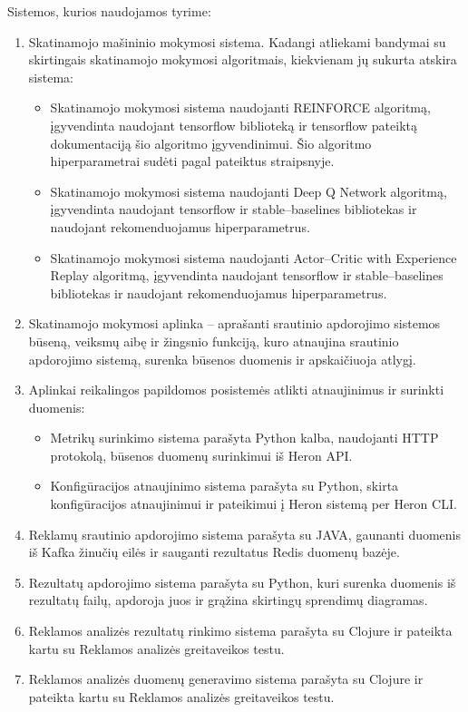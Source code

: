 \documentclass{VUMIFPSbakalaurinis}
\begin{document}
Sistemos, kurios naudojamos tyrime:
\begin{enumerate}
    \item Skatinamojo mašininio mokymosi sistema. Kadangi atliekami bandymai su skirtingais skatinamojo mokymosi algoritmais, kiekvienam jų sukurta atskira sistema: 
    \begin{itemize}
        \item Skatinamojo mokymosi sistema naudojanti REINFORCE algoritmą, įgyvendinta naudojant tensorflow biblioteką ir tensorflow pateiktą dokumentaciją šio algoritmo įgyvendinimui. Šio algoritmo hiperparametrai sudėti pagal pateiktus \cite{vaquero2018autotuning} straipsnyje.
        \item Skatinamojo mokymosi sistema naudojanti Deep Q Network algoritmą, įgyvendinta naudojant tensorflow ir stable–baselines bibliotekas ir naudojant rekomenduojamus hiperparametrus.
        \item Skatinamojo mokymosi sistema naudojanti Actor–Critic with Experience Replay algoritmą, įgyvendinta naudojant tensorflow ir stable–baselines bibliotekas ir naudojant rekomenduojamus hiperparametrus.
    \end{itemize}
    \item Skatinamojo mokymosi aplinka – aprašanti srautinio apdorojimo sistemos būseną, veiksmų aibę ir žingsnio funkciją, kuro atnaujina srautinio apdorojimo sistemą, surenka būsenos duomenis ir apskaičiuoja atlygį. 
    \item Aplinkai reikalingos papildomos posistemės atlikti atnaujinimus ir surinkti duomenis:
    \begin{itemize}
        \item Metrikų surinkimo sistema parašyta Python kalba, naudojanti HTTP protokolą, būsenos duomenų surinkimui iš Heron API.
        \item Konfigūracijos atnaujinimo sistema parašyta su Python, skirta konfigūracijos atnaujinimui ir pateikimui į Heron sistemą per Heron CLI.
    \end{itemize}
    \item Reklamų srautinio apdorojimo sistema parašyta su JAVA, gaunanti duomenis iš Kafka žinučių eilės ir sauganti rezultatus Redis duomenų bazėje.
    \item Rezultatų apdorojimo sistema parašyta su Python, kuri surenka duomenis iš rezultatų failų, apdoroja juos ir grąžina skirtingų sprendimų diagramas.
    \item Reklamos analizės rezultatų rinkimo sistema parašyta su Clojure ir pateikta kartu su Reklamos analizės greitaveikos testu.
    \item Reklamos analizės duomenų generavimo sistema parašyta su Clojure ir pateikta kartu su Reklamos analizės greitaveikos testu.
\end{enumerate}
\end{document}
